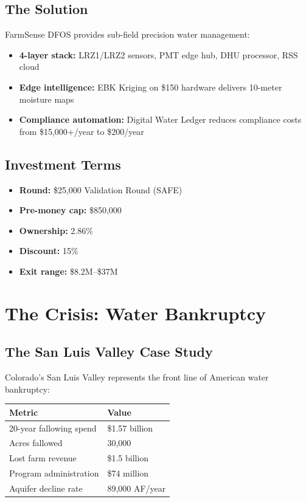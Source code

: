 \documentclass[10pt]{article}
\begin{document}
\subsection{The Solution}
FarmSense DFOS provides sub-field precision water management:
\begin{itemize}
    \item \textbf{4-layer stack:} LRZ1/LRZ2 sensors, PMT edge hub, DHU processor, RSS cloud
    \item \textbf{Edge intelligence:} EBK Kriging on \$150 hardware delivers 10-meter moisture maps
    \item \textbf{Compliance automation:} Digital Water Ledger reduces compliance costs from \$15,000+/year to \$200/year
\end{itemize}

\subsection{Investment Terms}
\begin{itemize}
    \item \textbf{Round:} \$25,000 Validation Round (SAFE)
    \item \textbf{Pre-money cap:} \$850,000
    \item \textbf{Ownership:} 2.86\%
    \item \textbf{Discount:} 15\%
    \item \textbf{Exit range:} \$8.2M–\$37M
\end{itemize}

\newpage

\section{The Crisis: Water Bankruptcy}

\subsection{The San Luis Valley Case Study}

Colorado's San Luis Valley represents the front line of American water bankruptcy:

\begin{table}[h]
\centering
\begin{tabular}{@{}ll@{}}
\toprule
\textbf{Metric} & \textbf{Value} \\
\midrule
20-year fallowing spend & \$1.57 billion \\
Acres fallowed & 30,000 \\
Lost farm revenue & \$1.5 billion \\
Program administration & \$74 million \\
Aquifer decline rate & 89,000 AF/year \\
\bottomrule
\end{tabular}
\end{table}
\end{document}

